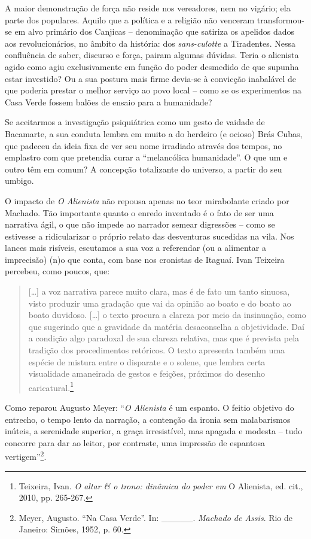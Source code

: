 A maior demonstração de força não reside nos vereadores, nem no vigário;
ela parte dos populares. Aquilo que a política e a religião não venceram
transformou-se em alvo primário dos Canjicas -- denominação que satiriza
os apelidos dados aos revolucionários, no âmbito da história: dos
\emph{sans-culotte} a Tiradentes. Nessa confluência de saber, discurso e
força, pairam algumas dúvidas. Teria o alienista agido como agiu
exclusivamente em função do poder desmedido de que supunha estar
investido? Ou a sua postura mais firme devia-se à convicção inabalável
de que poderia prestar o melhor serviço ao povo local -- como se os
experimentos na Casa Verde fossem balões de ensaio para a humanidade?

Se aceitarmos a investigação psiquiátrica como um gesto de vaidade de
Bacamarte, a sua conduta lembra em muito a do herdeiro (e ocioso) Brás
Cubas, que padeceu da ideia fixa de ver seu nome irradiado através dos
tempos, no emplastro com que pretendia curar a ``melancólica
humanidade''. O que um e outro têm em comum? A concepção totalizante do
universo, a partir do seu umbigo.

O impacto de \emph{O Alienista} não repousa apenas no teor mirabolante
criado por Machado. Tão importante quanto o enredo inventado é o fato de
ser uma narrativa ágil, o que não impede ao narrador semear digressões
-- como se estivesse a ridicularizar o próprio relato das desventuras
sucedidas na vila. Nos lances mais risíveis, escutamos a sua voz a
referendar (ou a alimentar a imprecisão) (n)o que conta, com base nos
cronistas de Itaguaí. Ivan Teixeira percebeu, como poucos, que:

\begin{quote}
{[}\ldots{}{]} a voz narrativa parece muito clara, mas é de fato um
tanto sinuosa, visto produzir uma gradação que vai da opinião ao boato e
do boato ao boato duvidoso. {[}\ldots{}{]} o texto procura a clareza por
meio da insinuação, como que sugerindo que a gravidade da matéria
desaconselha a objetividade. Daí a condição algo paradoxal de sua
clareza relativa, mas que é prevista pela tradição dos procedimentos
retóricos. O texto apresenta também uma espécie de mistura entre o
disparate e o solene, que lembra certa visualidade amaneirada de gestos
e feições, próximos do desenho caricatural.\footnote{Teixeira, Ivan.
  \emph{O altar \& o trono: dinâmica do poder em} O Alienista, ed. cit.,
  2010, pp. 265-267.}
\end{quote}

Como reparou Augusto Meyer: ``\emph{O Alienista} é um espanto. O feitio
objetivo do entrecho, o tempo lento da narração, a contenção da ironia
sem malabarismos inúteis, a serenidade superior, a graça irresistível,
mas apagada e modesta -- tudo concorre para dar ao leitor, por
contraste, uma impressão de espantosa vertigem''\footnote{Meyer,
  Augusto. ``Na Casa Verde''. In: \_\_\_\_\_. \emph{Machado de Assis}.
  Rio de Janeiro: Simões, 1952, p. 60.}.

